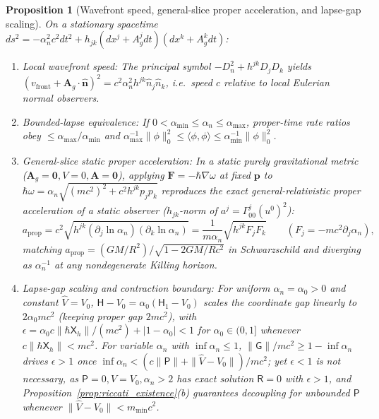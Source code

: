 \documentclass[aps,prd,onecolumn,tightenlines,nofootinbib,notitlepage,10pt,floatfix]{revtex4-2}
\theoremstyle{indentedtheorem}
\newtheorem{proposition}{Proposition}
\begin{document}
\begin{proposition}[Wavefront speed, general-slice proper acceleration, and lapse-gap scaling]\label{prop:causal_lapse_gap}
On a stationary spacetime $ds^2=-\alpha_n^2 c^2 dt^2+h_{jk}(dx^j+A_g^j dt)(dx^k+A_g^k dt)$:
\begin{enumerate}[label=(\roman*)]
\item \emph{Local wavefront speed:} The principal symbol $-D_n^2+h^{jk}D_j D_k$ yields $(v_\text{front}+\mathbf{A}_g\cdot\hat{\mathbf{n}})^2=c^2\alpha_n^2 h^{jk}\hat{n}_j\hat{n}_k$, i.e.\ speed $c$ relative to local Eulerian normal observers.
\item \emph{Bounded-lapse equivalence:} If $0<\alpha_{\min}\le\alpha_n\le\alpha_{\max}$, proper-time rate ratios obey $\le\alpha_{\max}/\alpha_{\min}$ and $\alpha_{\max}^{-1}\|\phi\|_0^2\le\langle\phi,\phi\rangle\le\alpha_{\min}^{-1}\|\phi\|_0^2$.
\item \emph{General-slice static proper acceleration:} In a static purely gravitational metric ($\mathbf{A}_g=\mathbf{0},V=0,\mathbf{A}=\mathbf{0}$), applying $\mathbf{F}=-\hbar\nabla\omega$ at fixed $\mathbf{p}$ to $\hbar\omega=\alpha_n\sqrt{(mc^2)^2+c^2 h^{jk}p_j p_k}$ reproduces the exact general-relativistic proper acceleration of a static observer ($h_{jk}$-norm of $a^j=\Gamma^j_{00}(u^0)^2$):
\begin{equation}
    a_\text{prop} = c^2\sqrt{h^{jk}(\partial_j\ln\alpha_n)(\partial_k\ln\alpha_n)} = \frac{1}{m\alpha_n}\sqrt{h^{jk}F_j F_k} \qquad (F_j = -mc^2\partial_j\alpha_n) ,
    \label{eq:proper_acceleration}
\end{equation}
matching $a_\text{prop}=(GM/R^2)/\sqrt{1-2GM/Rc^2}$ in Schwarzschild and diverging as $\alpha_n^{-1}$ at any nondegenerate Killing horizon.
\item \emph{Lapse-gap scaling and contraction boundary:} For uniform $\alpha_n=\alpha_0>0$ and constant $\hat{V}=V_0$, $\mathsf{H}-V_0=\alpha_0(\mathsf{H}_1-V_0)$ scales the coordinate gap linearly to $2\alpha_0 mc^2$ (keeping proper gap $2mc^2$), with $\epsilon=\alpha_0 c\|\hbar\mathsf{X}_h\|/(mc^2)+|1-\alpha_0|<1$ for $\alpha_0\in(0,1]$ whenever $c\|\hbar\mathsf{X}_h\|<mc^2$. For variable $\alpha_n$ with $\inf\alpha_n\le 1$, $\|\mathsf{G}\|/mc^2\ge 1-\inf\alpha_n$ drives $\epsilon>1$ once $\inf\alpha_n<(c\|\mathsf{P}\|+\|\hat{V}-V_0\|)/mc^2$; yet $\epsilon<1$ is not necessary, as $\mathsf{P}=0,\hat{V}=V_0,\alpha_n>2$ has exact solution $\mathsf{R}=0$ with $\epsilon>1$, and Proposition~\ref{prop:riccati_existence}(b) guarantees decoupling for unbounded $\mathsf{P}$ whenever $\|\hat{V}-V_0\|<m_{\min}c^2$.
\end{enumerate}
\end{proposition}
\end{document}
